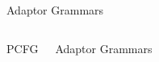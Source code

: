 
\newcommand{\AgHeader}[1]{\multicolumn{3}{c}{\begin{small}
      #1 \end{small} } \\ \hline}
\newcommand{\AgNonTerm}[2] {\textsc{#1}$_{#2}$}
\newcommand{\AgAdNonTerm}[2] {\underline{\textsc{#1}}$_{#2}$}
\newcommand{\AgRule}[2] { #1 $\mapsto$ #2 }
\newcommand{\AgEmpty}[1] { & & #1 }
\newcommand{\AgRange}[2] {$#1 = 1, \dots, #2$}



\begin{frame}{Adaptor Grammars}

  \begin{columns}
       \begin{block}{PCFG}

       \end{block}
        \begin{block}{Adaptor Grammars}
      \end{block}
      \end{columns}
\end{frame}





